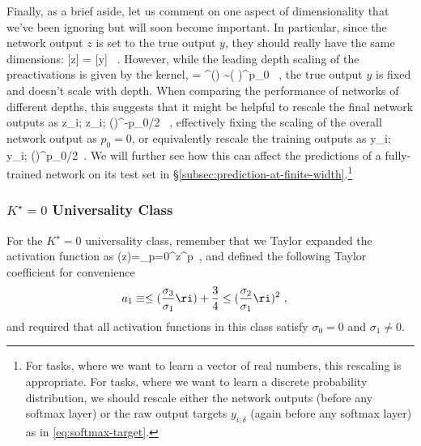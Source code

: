 Finally, as a brief aside, let us comment on one aspect of dimensionality that we've been ignoring but will soon become important. In particular, since the network output $z$ is set to the true output $y$, they should really have the same dimensions:
\be\label{eq:dimension-of-labels}
[z] = [y] \, .
\ee
However, while the leading depth scaling of the preactivations is given by the kernel,
\be
{} = \ker^{(\ell)} \sim \le( \ri)^{p_0} \, ,
\ee
the true output $y$ is fixed and doesn't scale with depth. When comparing the performance of networks of different depths, this suggests that it might be helpful to rescale the final network outputs as
\be
z_{i;\delta} \to z_{i;\delta} \le(\ri)^{-p_0/2} \, ,
\ee
effectively fixing the scaling of the overall network output as $p_0=0$,
or equivalently rescale the training outputs as
\be\label{eq:rescale-true-outputs}
y_{i;\tra} \to y_{i;\tra} \le(\ri)^{p_0/2} \,.
\ee
We will further see how this can affect the predictions of a fully-trained network on its test set in \S\ref{subsec:prediction-at-finite-width}.\footnote{
    For  tasks, where we want to learn a vector of real numbers, this rescaling is appropriate. For  tasks, where we want to learn a discrete probability distribution, we should rescale either the network outputs (before any softmax layer) or the raw output targets $y_{i;\delta}$ (again before any softmax layer) as in \eqref{eq:softmax-target}.
} 





\subsubsection{$K^\star=0$ Universality Class}


For the $K^\star=0$ universality class, remember that we Taylor expanded the activation function as %
\be\label{eq:taylor-expansion-k-star-reprint-last-actually-through}
\sigma(z)=\sum_{p=0}^{\infty}z^p\,  ,
\ee
and defined the following Taylor coefficient for convenience
\begin{align}
a_1&\equiv \le(\frac{\sigma_3}{\sigma_1}\ri)+\frac{3}{4}\le(\frac{\sigma_2}{\sigma_1}\ri)^2\ ,\label{eq:a1-recall-last-actually}
\end{align}
and required that all activation functions in this class satisfy $\sigma_0 = 0$ and $\sigma_1 \neq 0$.

